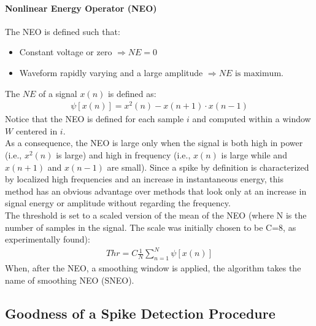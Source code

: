 \paragraph{Nonlinear Energy Operator (NEO)}
The NEO is defined such that:
\begin{itemize}
    \item Constant voltage or zero \(\Rightarrow NE=0\)
    \item Waveform rapidly varying and a large amplitude \(\Rightarrow NE \text{ is maximum}\).
\end{itemize}
The \(NE\) of a signal \(x(n)\) is defined as:
\begin{align*}
    \psi[x(n)]=x^2(n)-x(n+1)\cdot x(n-1)
\end{align*}
Notice that the NEO is defined for each sample \(i\) and computed within a
window \(W\) centered in \(i\).\\
As a consequence, the NEO is large only when the signal is both high in power (i.e., \(x^2(n)\) is large) and high in frequency (i.e., \(x(n)\) is large while and \(x(n+1)\) and \(x(n-1)\) are small). Since a spike by definition is characterized by localized high frequencies and an increase in instantaneous energy, this method has an obvious advantage over methods that look only at an increase in signal energy or amplitude without regarding the frequency. \\
The threshold is set to a scaled version of the mean of the NEO (where N is the number of samples in the signal. The scale was initially chosen to be C=8, as experimentally found):
\begin{align*}
    Thr=C\frac{1}{N}\sum_{n=1}^{N}\psi[x(n)]
\end{align*}
When, after the NEO, a smoothing window is applied, the algorithm takes the name of smoothing NEO (SNEO).
\subsection{Goodness of a Spike Detection Procedure}
